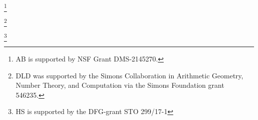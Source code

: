 
\author[Bourdon]{Abbey Bourdon}
\address{
  Abbey Bourdon,
  Wake Forest University,
  Department of Mathematics, 127 Manchester Hall, PO Box 7388, Winston-Salem, NC 27109
}
\thanks{AB is supported by NSF Grant DMS-2145270.}

\author[Hashimoto]{Sachi Hashimoto}
\address{  Sachi Hashimoto, Department of Mathematics,
  Brown University,
  Box 1917,
  151 Thayer Street,
  Providence, RI, 02912
}


\author[Keller]{Timo Keller}
\address{Timo Keller, Leibniz Universität Hannover, Institut für Algebra, Zahlentheorie und Diskrete Mathematik, Welfengarten 1, 30167 Hannover, Germany}

\author[Klagsbrun]{Zev Klagsbrun}
\address{Zev Klagsbrun, Center for Communications Research, San Diego, CA}



\author[Lowry-Duda]{David Lowry-Duda}
\address{%
  David Lowry-Duda, ICERM, 121 South Main Street, Box E, 11th Floor,
  Providence, RI, 02903
}
\thanks{%
  DLD was supported by the Simons Collaboration in Arithmetic Geometry, Number
  Theory, and Computation via the Simons Foundation grant 546235.
}
\author[Morrison]{Travis Morrison}
\address{Travis Morrison, 
Virginia Tech Department of Mathematics, 
226 Stanger Street, 
24061 Blacksburg, VA USA}

\author[Najman]{Filip Najman}
\address{
Filip Najman, University of Zagreb, Bijeni\v{c}ka Cesta 30, 10000 Zagreb, Croatia
}


\author[Shukla]{Himanshu Shukla}
\address{Himanshu Shukla, Mathematisches Institut, Uiversit\"{a}t Bayreuth, Universit\"{a}tstrasse 30, 95444 Bayreuth, Germany}
\thanks{HS is supported by the DFG-grant STO 299/17-1}


